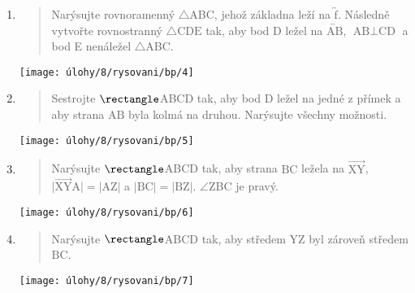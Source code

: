 \begin{enumerate}
    \item
    \begin{minipage}[t]{\linewidth}
        \begin{quote}
            Narýsujte rovnoramenný $\triangle$ABC, jehož základna leží na $\overleftrightarrow{\text{f}}$.
            Následně vytvořte rovnostranný $\triangle{\text{CDE}}$ tak, aby bod D ležel na $\overleftrightarrow{\text{AB}}$, $\text{AB} \perp \text{CD}$ a bod E nenáležel $\triangle$ABC\@.
        \end{quote}
        \centering
        \texttt{[image: úlohy/8/rysovani/bp/4]}

    \end{minipage}

    \item
    \begin{minipage}[t]{\linewidth}
        \begin{quote}
            Sestrojte $\rectangle$ABCD tak, aby bod D ležel na jedné z přímek a aby strana $\text{AB}$ byla kolmá na druhou.
            Narýsujte všechny možnosti.
        \end{quote}
        \centering
        \texttt{[image: úlohy/8/rysovani/bp/5]}

    \end{minipage}

    \item
    \begin{minipage}[t]{\linewidth}
        \begin{quote}
            Narýsujte $\rectangle$ABCD tak, aby strana $\text{BC}$ ležela na $\overrightarrow{\text{XY}}$, ${\lvert \overrightarrow{\text{XY}} \text{A} \rvert = \lvert \text{AZ} \rvert}$ a ${\lvert \text{BC} \rvert = \lvert \text{BZ} \rvert}$. $\angle$ZBC je pravý.
        \end{quote}
        \centering
        \texttt{[image: úlohy/8/rysovani/bp/6]}

    \end{minipage}

    \item
    \begin{minipage}[t]{\linewidth}
        \begin{quote}
            Narýsujte $\rectangle$ABCD tak, aby středem $\text{YZ}$ byl zároveň středem $\text{BC}$.
        \end{quote}
        \centering
        \texttt{[image: úlohy/8/rysovani/bp/7]}


\end{minipage}
\end{enumerate}
